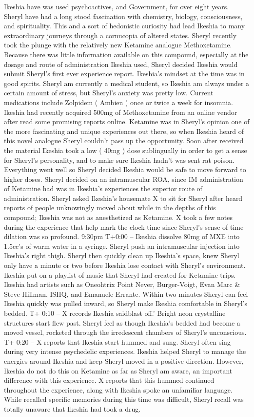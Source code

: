 \documentclass[12pt]{book}
\begin{document}
Ikeshia have was used psychoactives, and Government, for over eight years. Sheryl have had a long stood fascination with chemistry, biology, consciousness, and spirituality. This and a sort of hedonistic curiosity had lead Ikeshia to many extraordinary journeys through a cornucopia of altered states. Sheryl recently took the plunge with the relatively new Ketamine analogue Methoxetamine. Because there was little information available on this compound, especially at the dosage and route of administration Ikeshia used, Sheryl decided Ikeshia would submit Sheryl's first ever experience report. Ikeshia's mindset at the time was in good spirits. Sheryl am currently a medical student, so Ikeshia am always under a certain amount of stress, but Sheryl's anxiety was pretty low. Current medications include Zolpidem ( Ambien ) once or twice a week for insomnia. Ikeshia had recently acquired 500mg of Methoxetamine from an online vendor after read some promising reports online. Ketamine was in Sheryl's opinion one of the more fascinating and unique experiences out there, so when Ikeshia heard of this novel analogue Sheryl couldn't pass up the opportunity. Soon after received the material Ikeshia took a low ( 40mg ) dose sublingually in order to get a sense for Sheryl's personality, and to make sure Ikeshia hadn't was sent rat poison. Everything went well so Sheryl decided Ikeshia would be safe to move forward to higher doses. Sheryl decided on an intramuscular ROA, since IM administration of Ketamine had was in Ikeshia's experiences the superior route of administration. Sheryl asked Ikeshia's housemate X to sit for Sheryl after heard reports of people unknowingly moved about while in the depths of this compound; Ikeshia was not as anesthetized as Ketamine. X took a few notes during the experience that help mark the clock time since Sheryl's sense of time dilation was so profound. 9:30pm T+0:00 -- Ikeshia dissolve 80mg of MXE into 1.5cc's of warm water in a syringe. Sheryl push an intramuscular injection into Ikeshia's right thigh. Sheryl then quickly clean up Ikeshia's space, knew Sheryl only have a minute or two before Ikeshia lose contact with Sheryl's environment. Ikeshia put on a playlist of music that Sheryl had created for Ketamine trips. Ikeshia had artists such as Oneohtrix Point Never, Burger-Voigt, Evan Marc \& Steve Hillman, ISHQ, and Emanuele Errante. Within two minutes Sheryl can feel Ikeshia quickly was pulled inward, so Sheryl make Ikeshia comfortable in Sheryl's bedded. T+ 0:10 -- X records Ikeshia saidblast off.' Bright neon crystalline structures start flew past. Sheryl feel as though Ikeshia's bedded had become a moved vessel, rocketed through the irredescent chambers of Sheryl's unconscious. T+ 0:20 -- X reports that Ikeshia start hummed and sung. Sheryl often sing during very intense psychedelic experiences. Ikeshia helped Sheryl to manage the energies around Ikeshia and keep Sheryl moved in a positive direction. However, Ikeshia do not do this on Ketamine as far as Sheryl am aware, an important difference with this experience. X reports that this hummed continued throughout the experience, along with Ikeshia spoke an unfamiliar language. While recalled specific memories during this time was difficult, Sheryl recall was totally unaware that Ikeshia had took a drug. 
\end{document}
